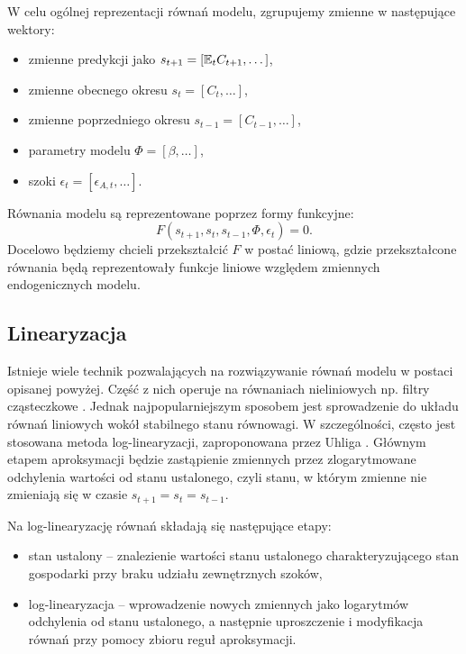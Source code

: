 W celu ogólnej reprezentacji równań modelu, zgrupujemy zmienne w następujące wektory:
\begin{itemize}
    \item zmienne predykcji jako $s_{t+1} = [\mathbb{E}_t C_{t+1}, \dots]$,
    \item zmienne obecnego okresu $s_t = [C_{t}, \dots]$,
    \item zmienne poprzedniego okresu $s_{t-1} = [C_{t-1}, \dots]$,
    \item parametry modelu $\Phi = [\beta, \dots]$,
    \item szoki $\epsilon_t = [\epsilon_{A, t}, \dots]$.
\end{itemize}
Równania modelu są reprezentowane poprzez formy funkcyjne:
\begin{equation}
    \label{eqn:dsgeEqnGen}
    F(s_{t+1}, s_t, s_{t-1}, \Phi, \epsilon_t) = 0.
\end{equation}
Docelowo będziemy chcieli przekształcić $F$ w postać liniową, gdzie przekształcone równania będą reprezentowały funkcje liniowe względem zmiennych endogenicznych modelu.

\subsection{Linearyzacja}
\label{sec:linearize_model}


Istnieje wiele technik pozwalających na rozwiązywanie równań modelu w postaci opisanej powyżej. Część z nich operuje na równaniach nieliniowych np. filtry cząsteczkowe \cite{herbst}. Jednak najpopularniejszym sposobem jest sprowadzenie do układu równań liniowych wokół stabilnego stanu równowagi. W szczególności, często jest stosowana metoda log-linearyzacji, zaproponowana przez Uhliga \cite{uhlig:1995}. Głównym etapem aproksymacji będzie zastąpienie zmiennych przez zlogarytmowane odchylenia wartości od stanu ustalonego, czyli stanu, w którym zmienne nie zmieniają się w czasie $s_{t+1} = s_{t} = s_{t-1}$.

Na log-linearyzację równań składają się następujące etapy:
\begin{itemize}
    \item stan ustalony -- znalezienie wartości stanu ustalonego charakteryzującego stan gospodarki przy braku udziału zewnętrznych szoków,
    \item log-linearyzacja -- wprowadzenie nowych zmiennych jako logarytmów odchylenia od stanu ustalonego, a następnie uproszczenie i modyfikacja równań przy pomocy zbioru reguł aproksymacji.
\end{itemize}

